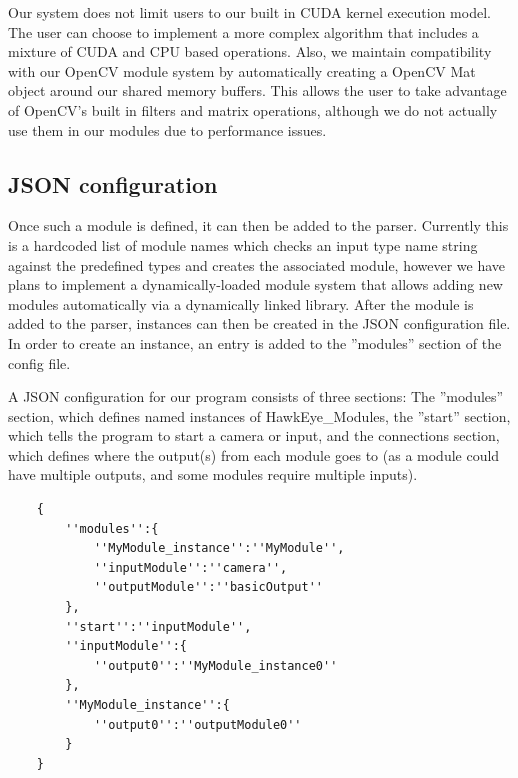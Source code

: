 \documentclass[letterpaper,10pt,titlepage]{IEEEtran}
\begin{document}
 \par
	Our system does not limit users to our built in CUDA kernel execution model. The user can choose to implement a more complex algorithm that includes a mixture of CUDA and CPU based operations. Also, we maintain compatibility with our OpenCV module system by automatically creating a OpenCV Mat object around our shared memory buffers. This allows the user to take advantage of OpenCV's built in filters and matrix operations, although we do not actually use them in our modules due to performance issues. \\

   \subsection{JSON configuration}
Once such a module is defined, it can then be added to the parser. Currently this is a hardcoded list of module names which checks an input type name string against the predefined types and creates the associated module, however we have plans to implement a dynamically-loaded module system that allows adding new modules automatically via a dynamically linked library. After the module is added to the parser, instances can then be created in the JSON configuration file. In order to create an instance, an entry is added to the ''modules'' section of the config file.\\   
\par
A JSON configuration for our program consists of three sections: The ''modules'' section, which defines named instances of HawkEye\_Modules, the ''start'' section, which tells the program to start a camera or input, and the connections section, which defines where the output(s) from each module goes to (as a module could have multiple outputs, and some modules require multiple inputs).\\
   \begin{lstlisting}
   	{
		''modules'':{
			''MyModule_instance'':''MyModule'',
			''inputModule'':''camera'',
			''outputModule'':''basicOutput''
		},
		''start'':''inputModule'',
		''inputModule'':{
			''output0'':''MyModule_instance0''
		},
		''MyModule_instance'':{
			''output0'':''outputModule0''
		}
	}
   \end{lstlisting}
 \par 
\end{document}
